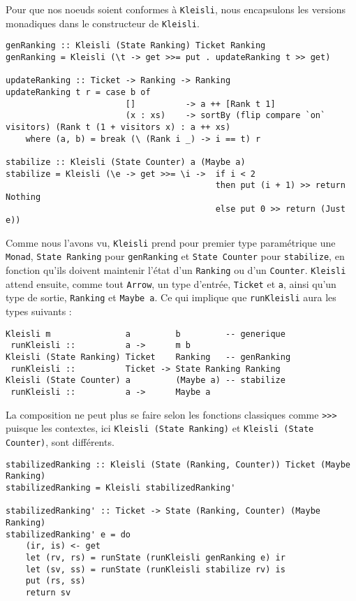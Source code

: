 \documentclass{llncs}
\begin{document}
Pour que nos noeuds soient conformes à \lstinline{Kleisli}, nous encapsulons les
versions monadiques dans le constructeur de \lstinline{Kleisli}.
\begin{lstlisting}
genRanking :: Kleisli (State Ranking) Ticket Ranking
genRanking = Kleisli (\t -> get >>= put . updateRanking t >> get)

updateRanking :: Ticket -> Ranking -> Ranking
updateRanking t r = case b of
                        []          -> a ++ [Rank t 1]
                        (x : xs)    -> sortBy (flip compare `on` visitors) (Rank t (1 + visitors x) : a ++ xs)
    where (a, b) = break (\ (Rank i _) -> i == t) r

stabilize :: Kleisli (State Counter) a (Maybe a)
stabilize = Kleisli (\e -> get >>= \i ->  if i < 2
                                          then put (i + 1) >> return Nothing
                                          else put 0 >> return (Just e))
\end{lstlisting}
Comme nous l'avons vu, \lstinline{Kleisli} prend pour premier type paramétrique
une \lstinline{Monad}, \lstinline{State Ranking} pour \lstinline{genRanking} et
\lstinline{State Counter} pour \lstinline{stabilize}, en fonction qu'ils doivent
maintenir l'état d'un \lstinline{Ranking} ou d'un \lstinline{Counter}.
\lstinline{Kleisli} attend ensuite, comme tout \lstinline{Arrow}, un type d'entrée,
\lstinline{Ticket} et \lstinline{a}, ainsi qu'un type de sortie, \lstinline{Ranking}
et \lstinline{Maybe a}.
Ce qui implique que \lstinline{runKleisli} aura les types suivants :
\begin{lstlisting}
Kleisli m               a         b         -- generique
 runKleisli ::          a ->      m b
Kleisli (State Ranking) Ticket    Ranking   -- genRanking
 runKleisli ::          Ticket -> State Ranking Ranking
Kleisli (State Counter) a         (Maybe a) -- stabilize
 runKleisli ::          a ->      Maybe a
\end{lstlisting}

La composition ne peut plus se faire selon les fonctions classiques comme \lstinline{>>>}
puisque les contextes, ici \lstinline{Kleisli (State Ranking)} et \lstinline{Kleisli (State Counter)},
sont différents.

\begin{lstlisting}
stabilizedRanking :: Kleisli (State (Ranking, Counter)) Ticket (Maybe Ranking)
stabilizedRanking = Kleisli stabilizedRanking'

stabilizedRanking' :: Ticket -> State (Ranking, Counter) (Maybe Ranking)
stabilizedRanking' e = do
    (ir, is) <- get
    let (rv, rs) = runState (runKleisli genRanking e) ir
    let (sv, ss) = runState (runKleisli stabilize rv) is
    put (rs, ss)
    return sv
\end{lstlisting}
\end{document}
